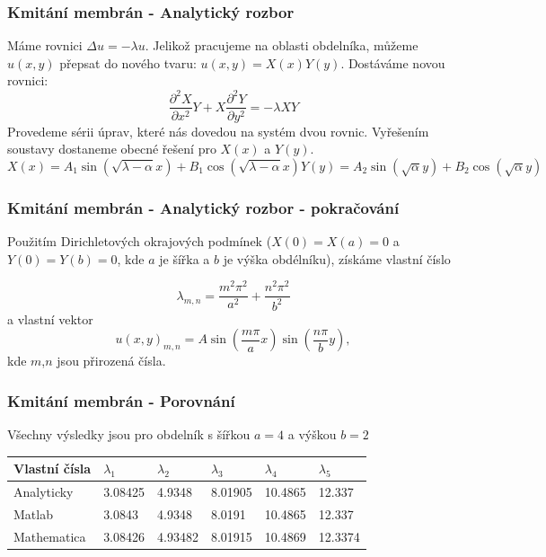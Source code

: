 \documentclass[xcolor=table]{beamer}
\begin{document}
\begin{frame}
\frametitle{Kmitání membrán - Analytický rozbor}
\pause
Máme rovnici $\Delta u=-\lambda u$. Jelikož pracujeme na oblasti obdelníka, můžeme $u(x,y)$ přepsat do nového tvaru: $u(x,y)=X(x) Y(y)$.
\pause
Dostáváme novou rovnici:
\begin{equation}
   \frac{\partial^2 X}{\partial x^2} Y
      + X \frac{\partial^2 Y}{\partial y^2}=-\lambda X Y
\end{equation}
\pause
Provedeme sérii úprav, které nás dovedou na systém dvou rovnic. Vyřešením soustavy dostaneme obecné řešení pro $X(x)$ a $Y(y)$.
\pause
\begin{subequations} 
\begin{equation}
X(x)=A_1 \sin{(\sqrt{\lambda-\alpha}x)}+B_1 \cos{(\sqrt{\lambda-\alpha}x)}
\end{equation}
\begin{equation}
Y(y)=A_2 \sin{(\sqrt{\alpha}y)}+B_2 \cos{(\sqrt{\alpha}y)}
\end{equation}
\end{subequations}

\end{frame}

\begin{frame}
\frametitle{Kmitání membrán - Analytický rozbor - pokračování}
Použitím Dirichletových okrajových podmínek ($X(0)=X(a)=0$ a $Y(0)=Y(b)=0$, kde $a$ je šířka a $b$ je výška obdélníku), získáme vlastní číslo

\begin{equation}
\lambda_{m,n}=\frac{m^2\pi^2}{a^2}+\frac{n^2\pi^2}{b^2}
\end{equation}
\pause
a vlastní vektor
\begin{equation}
u(x,y)_{m,n}=A\sin{(\frac{m\pi}{a}x)}\sin{(\frac{n\pi}{b}y)},
\end{equation}
kde $m$,$n$ jsou přirozená čísla.
\end{frame}

\begin{frame}
\frametitle{Kmitání membrán - Porovnání}
Všechny výsledky jsou pro obdelník s šířkou $a=4$ a výškou $b=2$

\begin{table}[]
\begin{tabular}{|llllll|}
\hline
\rowcolor[HTML]{EFEFEF} 
\cellcolor[HTML]{C0C0C0}Vlastní čísla & $\lambda_1$      & $\lambda_2$        & $\lambda_3$    & $\lambda_4$    & $\lambda_5$     \\ \hline
\rowcolor[HTML]{CBCEFB} 
\cellcolor[HTML]{9698ED}Analyticky    & 3.08425 & 4.9348  & 8.01905 & 10.4865 & 12.337  \\ \hline
\rowcolor[HTML]{FFCE93} 
\cellcolor[HTML]{FE996B}Matlab        & 3.0843  & 4.9348  & 8.0191  & 10.4865 & 12.337  \\ \hline
\rowcolor[HTML]{FFCCC9} 
\cellcolor[HTML]{FD6864}Mathematica   & 3.08426 & 4.93482 & 8.01915 & 10.4869 & 12.3374 \\ \hline
\end{tabular}
\end{table}

\end{frame}
\end{document}
